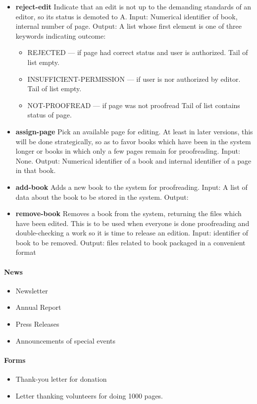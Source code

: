 \begin{itemize}
\item
  {\bf reject-edit}  Indicate that an edit is not up to the demanding
  standards of an editor, so its status is demoted to A.  Input:
  Numerical identifier of book, internal number of page.  Output: A
  list whose first element is one of three keywords indicating outcome:
  \begin{itemize}
  \item REJECTED --- if page had correct status and user is
    authorized. Tail of list empty. 
  \item INSUFFICIENT-PERMISSION ---
    if user is nor authorized by editor. Tail of list empty. 
  \item
    NOT-PROOFREAD --- if page was not proofread Tail of list contains
    status of page.
  \end{itemize}
\item
  {\bf assign-page}  Pick an available page for editing. At least in later
  versions, this will be done strategically, so as to favor books which
  have been in the system longer or books in which only a few pages
  remain for proofreading.  Input: None.  Output: Numerical
  identifier of a book and internal identifier of a page in that book.
\item
  {\bf add-book}  Adds a new book to the system for proofreading.  Input:
  A list of data about the book to be stored in the system.  Output:
\item
  {\bf remove-book}  Removes a book from the system, returning the files
  which have been edited. This is to be used when everyone is done
  proofreading and double-checking a work so it is time to release an
  edition.  Input: identifier of book to be removed.  Output: files
  related to book packaged in a convenient format
\end{itemize}

\paragraph{News}

\begin{itemize}
\item
  Newsletter
\item
  Annual Report
\item
  Press Releases
\item
  Announcements of special events
\end{itemize}

\paragraph{Forms}

\begin{itemize}
\item
  Thank-you letter for donation
\item
  Letter thanking volunteers for doing 1000 pages.
\end{itemize}
